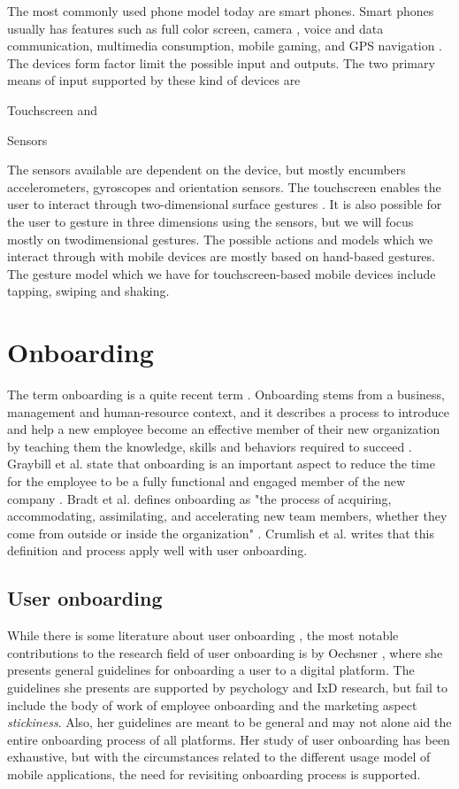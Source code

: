 The most commonly used phone model today are smart phones. Smart phones usually has features such as full color screen, camera \cite{Yu2012}, voice and data communication, multimedia consumption, mobile gaming, and GPS navigation \cite{Ruiz2011}. The devices form factor limit the possible input and outputs. The two primary means of input supported by these kind of devices are
\begin{enumerate*}
  \item Touchscreen and
  \item Sensors
\end{enumerate*}

The sensors available are dependent on the device, but mostly encumbers accelerometers, gyroscopes and orientation sensors. The touchscreen enables the user to interact through two-dimensional surface gestures \cite{Ruiz2011}. It is also possible for the user to gesture in three dimensions using the sensors, but we will focus mostly on twodimensional gestures. The possible actions and models which we interact through with mobile devices are mostly based on hand-based gestures. The gesture model which we have for touchscreen-based mobile devices include tapping, swiping and shaking.

\section{Onboarding}
The term onboarding is a quite recent term \cite{Dai2007}. Onboarding stems from a business, management and human-resource context, and it describes a process to introduce and help a new employee become an effective member of their new organization by teaching them the knowledge, skills and behaviors required to succeed \cite{Bauer2011}. Graybill et al. state that onboarding is an important aspect to reduce the time for the employee to be a fully functional and engaged member of the new company \cite{GraybillJolieO;HudsonCarpenterMariaTaesil;OffordJeromeJr;PiorunMary;Shaffer2013}. Bradt et al. defines onboarding as "the process of acquiring, accommodating, assimilating, and accelerating new team members, whether they come from outside or inside the organization" \cite{Bradt2009}. Crumlish et al. \cite{Crumlish2009} writes that this definition and process apply well with user onboarding.

\subsection{User onboarding}
While there is some literature about user onboarding \cite{Thomsen2016}, the most notable contributions to the research field of user onboarding is by Oechsner \cite{Oechsner2016}, where she presents general guidelines for onboarding a user to a digital platform. The guidelines she presents are supported by psychology and IxD research, but fail to include the body of work of employee onboarding and the marketing aspect \textit{stickiness}. Also, her guidelines are meant to be general and may not alone aid the entire onboarding process of all platforms. Her study of user onboarding has been exhaustive, but with the circumstances related to the different usage model of mobile applications, the need for revisiting onboarding process is supported.
